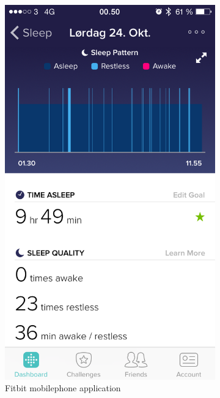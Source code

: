 \documentclass[12pt]{article} %
\begin{document}
\begin{figure}[H]
    \centering
    \begin{subfigure}[b]{0.45\textwidth}
        \includegraphics[width=\textwidth]{img/24-10-fitbit}
        \caption{Fitbit mobilephone application}
        \label{fig:fitbit0}
    \end{subfigure}
    ~ %
    \begin{subfigure}[b]{0.45\textwidth}

\end{subfigure}
\end{figure}
\end{document}
